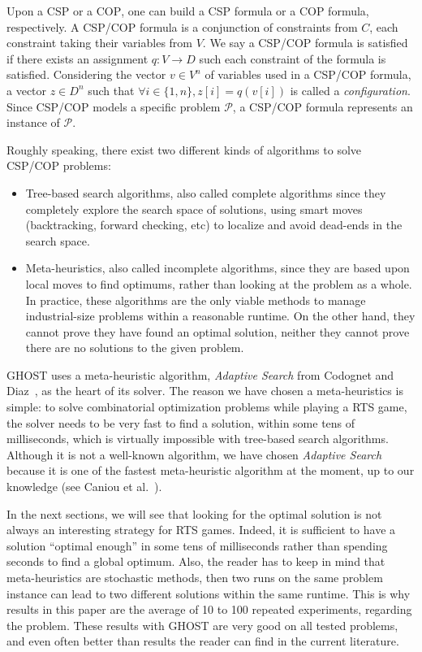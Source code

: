 \documentclass[journal]{IEEEtran}
\newcommand{\csp}{\textsc{CSP}\xspace}
\newcommand{\cop}{\textsc{COP}\xspace}
\newcommand{\ghost}{\textsc{GHOST}\xspace}
\begin{document}
Upon a \csp or a \cop, one can build a \csp formula or a \cop formula,
respectively.   A \csp/\cop  formula is  a conjunction  of constraints
from $C$,  each constraint taking their  variables from $V$. We  say a
\csp/\cop formula  is satisfied  if there exists  an assignment  $q: V
\rightarrow  D$   such  each   constraint  of  the   formula  is
satisfied. Considering the  vector $v \in V^n$ of variables  used in a
\csp/\cop formula, a vector $z \in D^n$ such that
$\forall i \in \{1,n\}, z[i] = q(v[i])$
is called a {\it configuration}.  Since
\csp/\cop models a specific problem $\mathcal{P}$, a \csp/\cop formula
represents an instance of $\mathcal{P}$.

Roughly speaking,  there exist  two different  kinds of  algorithms to
solve \csp/\cop problems:
\begin{itemize}
\item Tree-based  search algorithms,  also called  complete algorithms
  since they completely  explore the search space  of solutions, using
  smart moves  (backtracking, forward  checking, etc) to  localize and
  avoid dead-ends in the search space.
\item Meta-heuristics,  also called incomplete algorithms,  since they
  are based upon local moves to  find optimums, rather than looking at
  the problem as  a whole. In practice, these algorithms  are the only
  viable  methods   to  manage   industrial-size  problems   within  a
  reasonable runtime. On  the other hand, they cannot  prove they have
  found an  optimal solution, neither  they cannot prove there  are no
  solutions to the given problem.
\end{itemize}

\ghost uses a meta-heuristic algorithm, \emph{Adaptive Search} from
Codognet and Diaz~\cite{Codognet01}, as the heart of its solver.  The
reason we have chosen a meta-heuristics is simple: to solve
combinatorial optimization problems while playing a RTS game, the
solver needs to be very fast to find a solution, within some tens of
milliseconds, which is virtually impossible with tree-based search
algorithms. Although it is not a well-known algorithm, we have chosen
{\it Adaptive Search} because it is one of the fastest meta-heuristic
algorithm at the moment, up to our knowledge (see Caniou et
al.~\cite{Caniou14}).

In  the next  sections,  we  will see  that  looking  for the  optimal
solution is not always an  interesting strategy for RTS games. Indeed,
it is sufficient to have a solution ``optimal enough'' in some tens of
milliseconds   rather  than   spending  seconds   to  find   a  global
optimum. Also, the reader has to keep in mind that meta-heuristics are
stochastic methods, then  two runs on the same  problem instance can lead
to  two different  solutions within  the  same runtime.   This is  why
results  in  this  paper  are  the  average  of  10  to  100  repeated
experiments,  regarding the  problem.  These  results with  \ghost are
very good on  all tested problems, and even often  better than results
the reader can find in the current literature.
\end{document}
